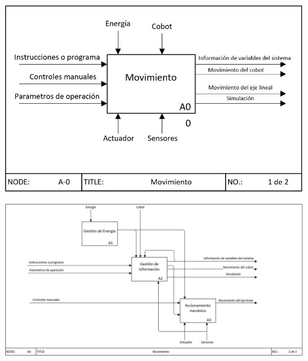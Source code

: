 \begin{center}
    \includegraphics[scale=0.55]{imagenes/IDEF0_Protocolo_A-0.png}
    \label{fig:idef_a0}
\end{center}
\begin{center}
    \includegraphics[scale=0.55]{imagenes/IDEF0_Protocolo_A-0_expandido.png}
    \label{fig:idef_a0_expand}
\end{center}

